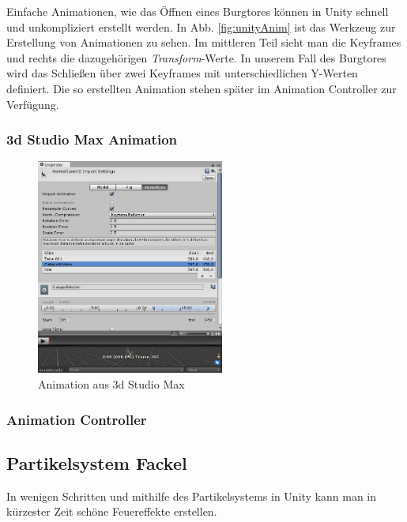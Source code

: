 Einfache Animationen, wie das Öffnen eines Burgtores können in Unity schnell und unkompliziert erstellt werden. In Abb. \ref{fig:unityAnim} ist das Werkzeug zur Erstellung von Animationen zu sehen. Im mittleren Teil sieht man die Keyframes und rechts die dazugehörigen \textit{Transform}-Werte. In unserem Fall des Burgtores wird das Schließen über zwei Keyframes mit unterschiedlichen Y-Werten definiert. Die so erstellten Animation stehen später im Animation Controller zur Verfügung.

\subsubsection{3d Studio Max Animation}

\begin{figure}
	\begin{center}
		\includegraphics[width=0.55\textwidth]{Abbildungen/Unity/3dsAnim}
	\end{center}
	\caption{Animation aus 3d Studio Max}
	\label{fig:3dsAnim}
\end{figure}

\blindtext

\subsubsection{Animation Controller}


\subsection{Partikelsystem Fackel}
In wenigen Schritten und mithilfe des Partikelsystems in Unity kann man in kürzester Zeit schöne Feuereffekte erstellen.

